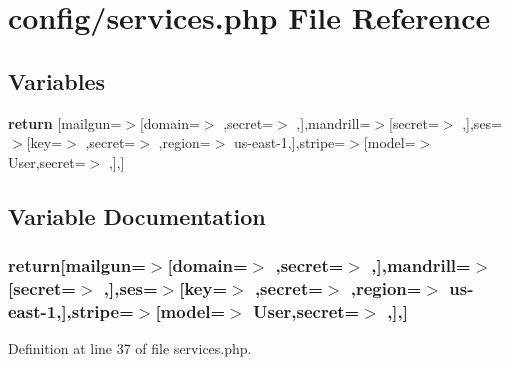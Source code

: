 \section{config/services.php File Reference}
\label{services_8php}
\subsection*{Variables}
\begin{DoxyCompactItemize}
\item 
{\bf return} [\textquotesingle{}mailgun\textquotesingle{}=$>$[\textquotesingle{}domain\textquotesingle{}=$>$ \textquotesingle{}\textquotesingle{},\textquotesingle{}secret\textquotesingle{}=$>$ \textquotesingle{}\textquotesingle{},],\textquotesingle{}mandrill\textquotesingle{}=$>$[\textquotesingle{}secret\textquotesingle{}=$>$ \textquotesingle{}\textquotesingle{},],\textquotesingle{}ses\textquotesingle{}=$>$[\textquotesingle{}key\textquotesingle{}=$>$ \textquotesingle{}\textquotesingle{},\textquotesingle{}secret\textquotesingle{}=$>$ \textquotesingle{}\textquotesingle{},\textquotesingle{}region\textquotesingle{}=$>$ \textquotesingle{}us-\/east-\/1\textquotesingle{},],\textquotesingle{}stripe\textquotesingle{}=$>$[\textquotesingle{}model\textquotesingle{}=$>$ \textquotesingle{}User\textquotesingle{},\textquotesingle{}secret\textquotesingle{}=$>$ \textquotesingle{}\textquotesingle{},],]
\end{DoxyCompactItemize}


\subsection{Variable Documentation}
\subsubsection[{return}]{\setlength{\rightskip}{0pt plus 5cm}return[\textquotesingle{}mailgun\textquotesingle{}=$>$[\textquotesingle{}domain\textquotesingle{}=$>$ \textquotesingle{}\textquotesingle{},\textquotesingle{}secret\textquotesingle{}=$>$ \textquotesingle{}\textquotesingle{},],\textquotesingle{}mandrill\textquotesingle{}=$>$[\textquotesingle{}secret\textquotesingle{}=$>$ \textquotesingle{}\textquotesingle{},],\textquotesingle{}ses\textquotesingle{}=$>$[\textquotesingle{}key\textquotesingle{}=$>$ \textquotesingle{}\textquotesingle{},\textquotesingle{}secret\textquotesingle{}=$>$ \textquotesingle{}\textquotesingle{},\textquotesingle{}region\textquotesingle{}=$>$ \textquotesingle{}us-\/east-\/1\textquotesingle{},],\textquotesingle{}stripe\textquotesingle{}=$>$[\textquotesingle{}model\textquotesingle{}=$>$ \textquotesingle{}User\textquotesingle{},\textquotesingle{}secret\textquotesingle{}=$>$ \textquotesingle{}\textquotesingle{},],]}\label{services_8php_af061a8cae10d56249fca12df09231dbf}


Definition at line 37 of file services.\+php.

